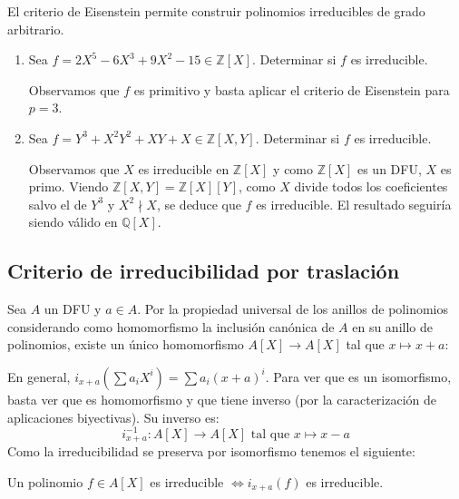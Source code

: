 \begin{corollary}
El criterio de Eisenstein permite construir polinomios irreducibles de grado arbitrario. 
\end{corollary}

\begin{example}
\begin{enumerate}
\item Sea $f = 2X^5 - 6X^3 + 9X^2 - 15 \in \mathbb{Z}[X]$. Determinar si $f$ es irreducible. 

Observamos que $f$ es primitivo y basta aplicar el criterio de Eisenstein para $p = 3$. 

\item Sea $f = Y^3 + X^2Y^2 + XY + X \in \mathbb{Z}[X,Y]$. Determinar si $f$ es irreducible. 

Observamos que $X$ es irreducible en $\mathbb{Z}[X]$ y como $\mathbb{Z}[X]$ es un DFU, $X$ es primo. Viendo $\mathbb{Z}[X,Y] = \mathbb{Z}[X][Y]$, como $X$ divide todos los coeficientes salvo el de $Y^3$ y $X^2 \nmid X$, se deduce que $f$ es irreducible. El resultado seguiría siendo válido en $\mathbb{Q}[X]$. 
\end{enumerate}
\end{example}

\subsection{Criterio de irreducibilidad por traslación}

Sea $A$ un DFU y $a \in A$. Por la propiedad universal de los anillos de polinomios considerando como homomorfismo la inclusión canónica de $A$ en su anillo de polinomios, existe un único homomorfismo $A[X] \to A[X]$ tal que $x \mapsto x+a$:


En general, $i_{x+a}(\sum a_iX^i) = \sum a_i(x+a)^i$. Para ver que es un isomorfismo, basta ver que es homomorfismo \cite{link3} y que tiene inverso (por la caracterización de aplicaciones biyectivas). Su inverso es: $$i_{x+a}^{-1}:A[X] \to A[X] \text{ tal que } x \mapsto x-a$$ Como la irreducibilidad se preserva por isomorfismo tenemos el siguiente:

\begin{theorem}
Un polinomio $f \in A[X]$ es irreducible $\iff i_{x+a}(f)$ es irreducible. 
\end{theorem}


